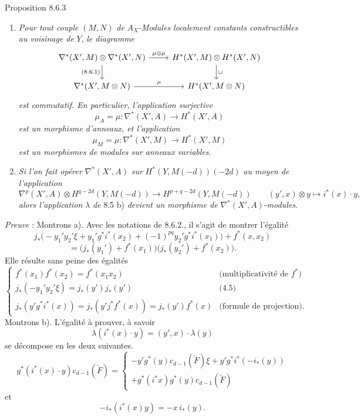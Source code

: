 \begin{statement}{Proposition 8.6.3}
\begin{enumerate}[label=\alph*)]
\item \emph{Pour tout couple} $(M,N)$ \emph{de} $A_X$-\emph{Modules localement constants constructibles au voisinage de} $Y$, \emph{le diagramme}
\[
\begin{tikzcd}
\nabla^*(X',M)\otimes\nabla^*(X',N)\arrow[r,"\mu\otimes\mu"]\arrow[d,"{(8.6.1)}"']&
H^*(X',M)\otimes H^*(X',N)\arrow[d,"\cup"]\\
\nabla^*(X',M\otimes N)\arrow[r,"\mu"]&
H^*(X',M\otimes N)
\end{tikzcd}
\]
\emph{est commutatif. En particulier, l'application surjective}
\[
\mu_A=\mu:\nabla^*(X',A)\to H^*(X',A)
\]
\emph{est un morphisme d'anneaux, et l'application}
\[
\mu_M=\mu:\nabla^*(X',M)\to H^*(X',M)
\]
\emph{est un morphismes de modules sur anneaux variables}.
\item \emph{Si l'on fait opérer} $\nabla^*(X',A)$ \emph{sur} $H^*(Y,M(-d))(-2d)$ \emph{au moyen de l'application}
\[
\nabla^p(X',A)\otimes H^{q-2d}(Y,M(-d))
\to H^{p+q-2d}(Y,M(-d))
\qquad
(y',x)\otimes y\mapsto i^*(x)\cdot y,
\]
\emph{alors l'application} $\lambda$ \emph{de} 8.5 b) \emph{devient un morphisme de} $\nabla^*(X',A)$-\emph{modules}.
\end{enumerate}
\end{statement}

\emph{Preuve} : Montrons a). Avec les notations de 8.6.2., il s'agit de montrer l'égalité
\[
j_*\bigl(-y_1'y_2'\xi+y_1'g^*i^*(x_2)+(-1)^{pq}y_2'g^*i^*(x_1)\bigr)+f^*(x,x_2)
\]
\[
=\bigl(j_*(y_1')+f^*(x_1)\bigr)\bigl(j_*(y_2')+f^*(x_2)\bigr).
\]
Elle résulte sans peine des égalités
\[
\begin{cases}
f^*(x_1)f^*(x_2)=f^*(x_1x_2)&\text{(multiplicativité de }f^*\text{)}\\
j_*(-y_1'y_2'\xi)=j_*(y')j_*(y')&\text{(4.5)}\\
j_*(y'g^*i^*(x))=j_*(y'j^*f^*(x))=j_*(y')f^*(x)&\text{(formule de projection)}.
\end{cases}
\]
Montrons b). L'égalité à prouver, à savoir
\[
\lambda(i^*(x)\cdot y)=(y',x)\cdot\lambda(y)
\]
se décompose en les deux suivantes.
\[
g^*(i^*(x)\cdot y)c_{d-1}(\check F)
=
\begin{cases}
-y'g^*(y)c_{d-1}(\check F)\xi+y'g^*i^*(-i_*(y))\\
+g^*(i^*x)g^*(y)c_{d-1}(\check F)
\end{cases}
\]
et
\[
-i_*(i^*(x)y)=-x\,i_*(y).
\]

